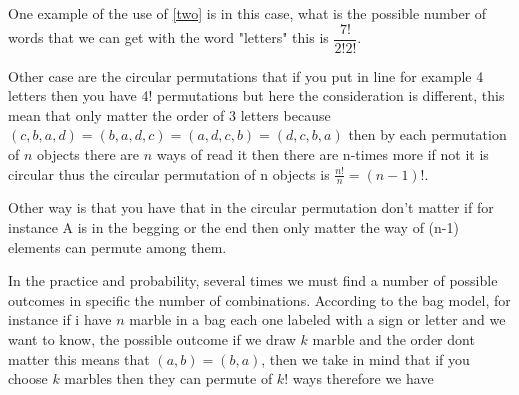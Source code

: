\documentclass[10pt,a4paper]{article}
\begin{document}
One example of the use of \ref{two} is in this case, what is the possible number of words that we can get with the word "letters" this is $\dfrac{7!}{2!2!}$.


Other case are the circular permutations  that if you put in line for example 4 letters then you have 4! permutations but here the consideration is different, this mean that only matter the order of 3 letters because $(c,b,a,d)=(b,a,d,c)=(a,d,c,b)=(d,c,b,a)$
then by each permutation of $n$ objects there are $n$ ways of read it then there are  n-times more if not it is circular thus the circular permutation of n objects is $\frac{n!}{n}=(n-1)!$.



\begin{center}



\end{center}


Other way is that you have that in the circular permutation don't matter if for instance A is in the begging or the end then only matter the way of (n-1) elements can permute among them. 

In the practice and probability, several times we must find a number of possible outcomes in specific the number of combinations. According to the bag model, for instance if i have $n$ marble in a bag each one labeled with a sign or letter and we want to know, the possible outcome if we draw $k$ marble and the order dont matter this means that $(a,b)=(b,a)$, then we take in mind that if you choose $k$ marbles then they can permute of $k!$ ways therefore we have 
\end{document}
